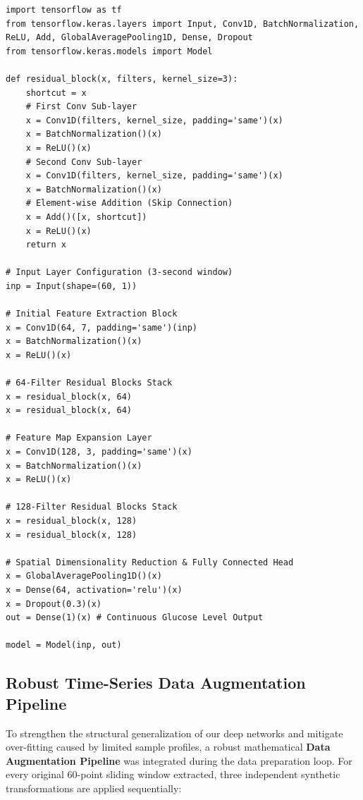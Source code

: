 \begin{verbatim}
import tensorflow as tf
from tensorflow.keras.layers import Input, Conv1D, BatchNormalization, ReLU, Add, GlobalAveragePooling1D, Dense, Dropout
from tensorflow.keras.models import Model

def residual_block(x, filters, kernel_size=3):
    shortcut = x
    # First Conv Sub-layer
    x = Conv1D(filters, kernel_size, padding='same')(x)
    x = BatchNormalization()(x)
    x = ReLU()(x)
    # Second Conv Sub-layer
    x = Conv1D(filters, kernel_size, padding='same')(x)
    x = BatchNormalization()(x)
    # Element-wise Addition (Skip Connection)
    x = Add()([x, shortcut])
    x = ReLU()(x)
    return x

# Input Layer Configuration (3-second window)
inp = Input(shape=(60, 1))

# Initial Feature Extraction Block
x = Conv1D(64, 7, padding='same')(inp)
x = BatchNormalization()(x)
x = ReLU()(x)

# 64-Filter Residual Blocks Stack
x = residual_block(x, 64)
x = residual_block(x, 64)

# Feature Map Expansion Layer
x = Conv1D(128, 3, padding='same')(x)
x = BatchNormalization()(x)
x = ReLU()(x)

# 128-Filter Residual Blocks Stack
x = residual_block(x, 128)
x = residual_block(x, 128)

# Spatial Dimensionality Reduction & Fully Connected Head
x = GlobalAveragePooling1D()(x)
x = Dense(64, activation='relu')(x)
x = Dropout(0.3)(x)
out = Dense(1)(x) # Continuous Glucose Level Output

model = Model(inp, out)
\end{verbatim}
\vspace{1.5em}

\subsection{Robust Time-Series Data Augmentation Pipeline}
To strengthen the structural generalization of our deep networks and mitigate over-fitting caused by limited sample profiles, a robust mathematical \textbf{Data Augmentation Pipeline} was integrated during the data preparation loop. For every original 60-point sliding window extracted, three independent synthetic transformations are applied sequentially:

